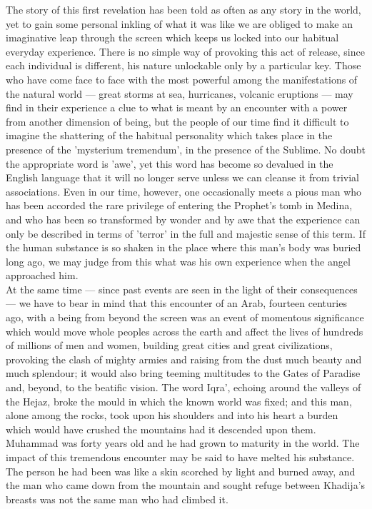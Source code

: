 \documentclass[10pt, twoside,openright]{book}
\begin{document}
The story of this first revelation has been told as often as any story in the world, yet to gain some 
personal inkling of what it was like we are obliged to make an imaginative leap through the screen 
which keeps us locked into our habitual everyday experience. There is no simple way of provoking this 
act of release, since each individual is different, his nature unlockable only by a particular key. 
Those who have come face to face with the most powerful among the manifestations of the natural world 
--- great storms at sea, hurricanes, volcanic eruptions --- may find in their experience a clue to what 
is meant by an encounter with a power from another dimension of being, but the people of our time 
find it difficult to imagine the shattering of the habitual personality which takes place in the 
presence of the 'mysterium tremendum', in the presence of the Sublime. No doubt the appropriate word 
is 'awe', yet this word has become so devalued in the English language that it will no longer serve 
unless we can cleanse it from trivial associations. Even in our time, however, one occasionally meets 
a pious man who has been accorded the rare privilege of entering the Prophet's tomb in Medina, and 
who has been so transformed by wonder and by awe that the experience can only be described in terms 
of 'terror' in the full and majestic sense of this term. If the human substance is so shaken in the 
place where this man's body was buried long ago, we may judge from this what was his own experience 
when the angel approached him. \\

At the same time --- since past events are seen in the light of their consequences --- we have to bear in 
mind that this encounter of an Arab, fourteen centuries ago, with a being from beyond the screen was 
an event of momentous significance which would move whole peoples across the earth and affect the 
lives of hundreds of millions of men and women, building great cities and great civilizations, 
provoking the clash of mighty armies and raising from the dust much beauty and much splendour; it 
would also bring teeming multitudes to the Gates of Paradise and, beyond, to the beatific vision. The 
word Iqra', echoing around the valleys of the Hejaz, broke the mould in which the known world was 
fixed; and this man, alone among the rocks, took upon his shoulders and into his heart a burden which 
would have crushed the mountains had it descended upon them. \\

Muhammad was forty years old and he had grown to maturity in the world. The impact of this tremendous 
encounter may be said to have melted his substance. The person he had been was like a skin scorched 
by light and burned away, and the man who came down from the mountain and sought refuge between 
Khadija's breasts was not the same man who had climbed it. \\
\end{document}
